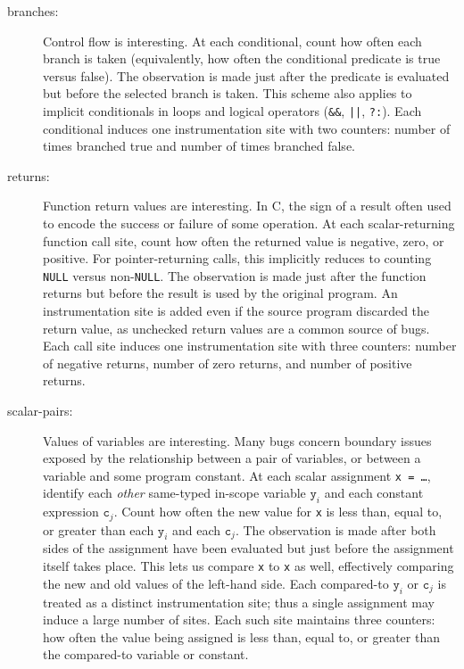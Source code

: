 \documentclass{sig-alternate}
\begin{document}
\begin{description}
\item[branches:] Control flow is interesting.  At each conditional,
  count how often each branch is taken (equivalently, how often the
  conditional predicate is true versus false).  The observation is
  made just after the predicate is evaluated but before the selected
  branch is taken.  This scheme also applies to implicit conditionals
  in loops and logical operators (\texttt{\&\&}, \texttt{||},
  \texttt{?:}).  Each conditional induces one instrumentation site
  with two counters: number of times branched true and number of times
  branched false.

\item[returns:] Function return values are interesting.  In C, the
  sign of a result often used to encode the success or failure of some
  operation.  At each scalar-returning function call site, count how
  often the returned value is negative, zero, or positive.  For
  pointer-returning calls, this implicitly reduces to counting
  \texttt{NULL} versus non-\texttt{NULL}.  The observation is made
  just after the function returns but before the result is used by the
  original program.  An instrumentation site is added even if the
  source program discarded the return value, as unchecked return
  values are a common source of bugs.  Each call site induces one
  instrumentation site with three counters: number of negative
  returns, number of zero returns, and number of positive returns.

\item[scalar-pairs:] Values of variables are interesting.  Many bugs
  concern boundary issues exposed by the relationship between a pair
  of variables, or between a variable and some program constant.  At
  each scalar assignment \texttt{x = \dots}, identify each
  \emph{other} same-typed in-scope variable $\mathtt{y}_i$ and each
  constant expression $\mathtt{c}_j$.  Count how often the new value
  for \texttt{x} is less than, equal to, or greater than each
  $\mathtt{y}_i$ and each $\mathtt{c}_j$.  The observation is made
  after both sides of the assignment have been evaluated but just
  before the assignment itself takes place.  This lets us compare
  \texttt{x} to \texttt{x} as well, effectively comparing the new and
  old values of the left-hand side.  Each compared-to $\mathtt{y}_i$
  or $\mathtt{c}_j$ is treated as a distinct instrumentation site;
  thus a single assignment may induce a large number of sites.  Each
  such site maintains three counters: how often the value being
  assigned is less than, equal to, or greater than the compared-to
  variable or constant.
\end{description}
\end{document}
